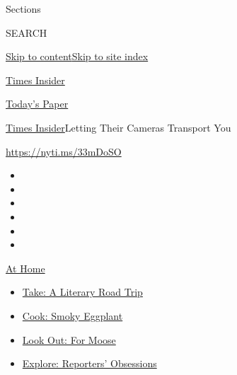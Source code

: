 Sections

SEARCH

\protect\hyperlink{site-content}{Skip to
content}\protect\hyperlink{site-index}{Skip to site index}

\href{https://www.nytimes.com/section/reader-center}{Times Insider}

\href{https://myaccount.nytimes.com/auth/login?response_type=cookie\&client_id=vi}{}

\href{https://www.nytimes.com/section/todayspaper}{Today's Paper}

\href{/section/reader-center}{Times Insider}\textbar{}Letting Their
Cameras Transport You

\url{https://nyti.ms/33mDoSO}

\begin{itemize}
\item
\item
\item
\item
\item
\item
\end{itemize}

\href{https://www.nytimes.com/spotlight/at-home?action=click\&pgtype=Article\&state=default\&region=TOP_BANNER\&context=at_home_menu}{At
Home}

\begin{itemize}
\tightlist
\item
  \href{https://www.nytimes.com/2020/07/28/books/time-for-a-literary-road-trip.html?action=click\&pgtype=Article\&state=default\&region=TOP_BANNER\&context=at_home_menu}{Take:
  A Literary Road Trip}
\item
  \href{https://www.nytimes.com/2020/07/29/magazine/bored-with-your-home-cooking-some-smoky-eggplant-will-fix-that.html?action=click\&pgtype=Article\&state=default\&region=TOP_BANNER\&context=at_home_menu}{Cook:
  Smoky Eggplant}
\item
  \href{https://www.nytimes.com/2020/07/27/travel/moose-michigan-isle-royale.html?action=click\&pgtype=Article\&state=default\&region=TOP_BANNER\&context=at_home_menu}{Look
  Out: For Moose}
\item
  \href{https://www.nytimes.com/interactive/2020/at-home/even-more-reporters-editors-diaries-lists-recommendations.html?action=click\&pgtype=Article\&state=default\&region=TOP_BANNER\&context=at_home_menu}{Explore:
  Reporters' Obsessions}
\end{itemize}

